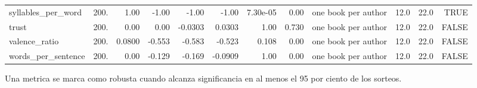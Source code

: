 \begin{table}[htbp]
\begin{tabular}{lrrrrrrrrrrr}
syllables\_per\_word & 200. & 1.00 & -1.00 & -1.00 & -1.00 & 7.30e-05 & 0.00 & one book per author & 12.0 & 22.0 & TRUE \\
trust & 200. & 0.00 & 0.00 & -0.0303 & 0.0303 & 1.00 & 0.730 & one book per author & 12.0 & 22.0 & FALSE \\
valence\_ratio & 200. & 0.0800 & -0.553 & -0.583 & -0.523 & 0.108 & 0.00 & one book per author & 12.0 & 22.0 & FALSE \\
words\_per\_sentence & 200. & 0.00 & -0.129 & -0.169 & -0.0909 & 1.00 & 0.00 & one book per author & 12.0 & 22.0 & FALSE \\
\bottomrule
\end{tabular}
\vspace{0.5em}
\begin{minipage}{\linewidth}\footnotesize Una metrica se marca como robusta cuando alcanza significancia en al menos el 95 por ciento de los sorteos.\end{minipage}
\end{table}

